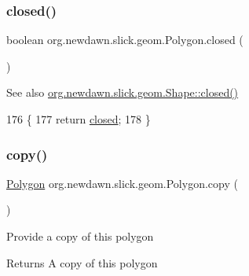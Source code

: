 \subsubsection{\texorpdfstring{closed()}{closed()}}
{\footnotesize\ttfamily boolean org.\+newdawn.\+slick.\+geom.\+Polygon.\+closed (\begin{DoxyParamCaption}{ }\end{DoxyParamCaption})\hspace{0.3cm}{\ttfamily [inline]}}

\begin{DoxySeeAlso}{See also}
\mbox{\hyperlink{classorg_1_1newdawn_1_1slick_1_1geom_1_1_shape_a95d6725fbfa1ab9baff9bd721da82241}{org.\+newdawn.\+slick.\+geom.\+Shape\+::closed()}} 
\end{DoxySeeAlso}

\begin{DoxyCode}
176                             \{
177         \textcolor{keywordflow}{return} \mbox{\hyperlink{classorg_1_1newdawn_1_1slick_1_1geom_1_1_polygon_a8ca548fdf2452ba39c43fe3ba20b9ee8}{closed}};
178     \}
\end{DoxyCode}
\mbox{\label{classorg_1_1newdawn_1_1slick_1_1geom_1_1_polygon_aa88a422eaf9d7493b359aea5687aad78}} 
\subsubsection{\texorpdfstring{copy()}{copy()}}
{\footnotesize\ttfamily \mbox{\hyperlink{classorg_1_1newdawn_1_1slick_1_1geom_1_1_polygon}{Polygon}} org.\+newdawn.\+slick.\+geom.\+Polygon.\+copy (\begin{DoxyParamCaption}{ }\end{DoxyParamCaption})\hspace{0.3cm}{\ttfamily [inline]}}

Provide a copy of this polygon

\begin{DoxyReturn}{Returns}
A copy of this polygon 
\end{DoxyReturn}

